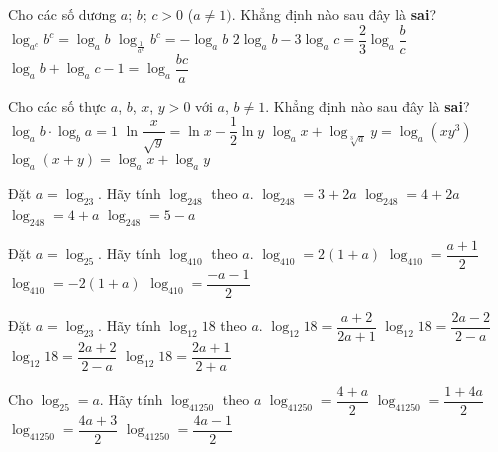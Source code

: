 \begin{ex}%
	Cho các số dương $a$; $b$; $c>0$ ($a\neq 1)$. Khẳng định nào sau đây là \textbf{sai}?
	\choice
	{$\log_{a^c}b^c=\log_ab$}
	{$\log_{\tfrac{1}{a^c}}b^c=-\log_ab$}
	{\True $2\log_ab-3\log_ac=\dfrac{2}{3}\log_a\dfrac{b}{c}$}
	{$\log_ab+\log_ac-1=\log_a\dfrac{bc}{a}$}
\end{ex}

\begin{ex}%
	Cho các số thực $a$, $b$, $x$, $y>0$ với $a$, $b\neq 1$. Khẳng định nào sau đây là \textbf{sai}? 
	\choice
	{$\log_ab\cdot\log_ba=1$}
	{$\ln\dfrac{x}{\sqrt{y}}=\ln x-\dfrac{1}{2}\ln y$}
	{$\log_ax+\log_{\sqrt[3]{a}}y=\log_a\left(xy^3\right)$}
	{\True $\log_a(x+y)=\log_ax+\log_ay$}
\end{ex}

\begin{ex}%
	Đặt $a=\log_23$. Hãy tính $\log_248$ theo $a$.
	\choice
	{$\log_248=3+2a$}
	{$\log_248=4+2a$}
	{\True $\log_248=4+a$}
	{$\log_248=5-a$}
\end{ex}

\begin{ex}%
	Đặt $a=\log_25$. Hãy tính $\log_410$ theo $a$.
	\choice
	{$\log_410=2(1+a)$}
	{\True $\log_410=\dfrac{a+1}{2}$}
	{$\log_410=-2(1+a)$}
	{$\log_410=\dfrac{-a-1}{2}$}
\end{ex}

\begin{ex}%
	Đặt $a=\log_23$. Hãy tính $\log_{12}18$ theo $a$.
	\choice
	{$\log_{12}18=\dfrac{a+2}{2a+1}$}
	{$\log_{12}18=\dfrac{2a-2}{2-a}$}
	{$\log_{12}18=\dfrac{2a+2}{2-a}$}
	{\True $\log_{12}18=\dfrac{2a+1}{2+a}$}
\end{ex}

\begin{ex}%
	Cho $\log_25=a$. Hãy tính $\log_41250$ theo $a$
	\choice
	{$\log_41250=\dfrac{4+a}{2}$}
	{\True $\log_41250=\dfrac{1+4a}{2}$}
	{$\log_41250=\dfrac{4a+3}{2}$}
	{$\log_41250=\dfrac{4a-1}{2}$}
\end{ex}

